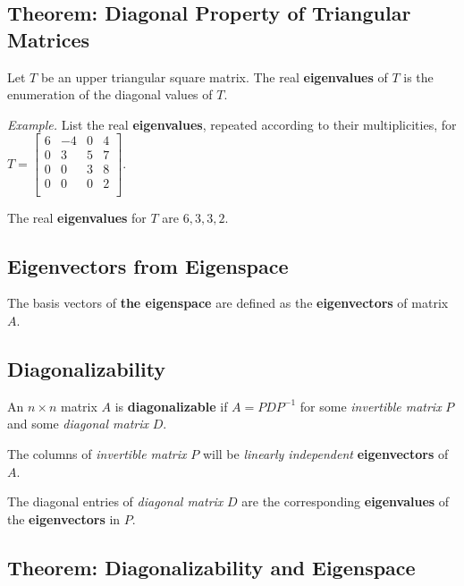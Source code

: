 \documentclass[12pt, letterpaper]{article}
\begin{document}
  \subsection*{Theorem: Diagonal Property of Triangular Matrices}

  Let $ T $ be an upper triangular square matrix. The real
  \textbf{eigenvalues} of $ T $ is the enumeration of the diagonal
  values of $ T $.

  \bigskip

  \textit{Example.} List the real \textbf{eigenvalues}, repeated
  according to their multiplicities, for $ T =
  \begin{bmatrix}
    6 & -4 & 0 & 4 \\
    0 & 3 & 5 & 7 \\
    0 & 0 & 3 & 8 \\
    0 & 0 & 0 & 2 \\
  \end{bmatrix} $.

  \bigskip

  The real \textbf{eigenvalues} for $ T $ are $ 6, 3, 3, 2 $.

  \subsection*{Eigenvectors from Eigenspace}

  The basis vectors of \textbf{the eigenspace} are defined as the
  \textbf{eigenvectors} of matrix $ A $.

  \subsection*{Diagonalizability}

  An $ n \times n $ matrix $ A $ is \textbf{diagonalizable} if $ A =
  PDP^{-1} $ for some \textit{invertible matrix} $ P $ and some
  \textit{diagonal matrix} $ D $.
  \medskip

  The columns of \textit{invertible matrix} $ P $ will be
  \textit{linearly independent} \textbf{eigenvectors} of $ A $.
  \medskip

  The diagonal entries of \textit{diagonal matrix} $ D $ are the
  corresponding \textbf{eigenvalues} of the \textbf{eigenvectors} in $ P $.

  \subsection*{Theorem: Diagonalizability and Eigenspace}
\end{document}
